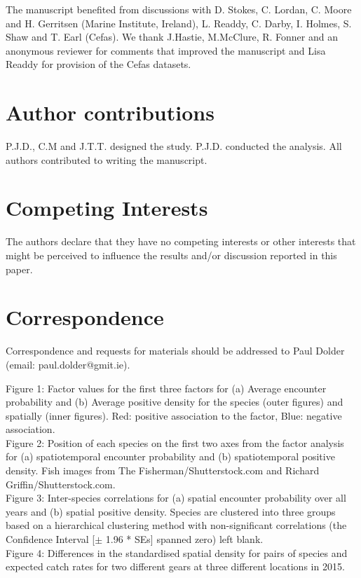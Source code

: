 \documentclass[fleqn,10pt]{wlscirep}
\begin{document}
The manuscript benefited from discussions with D. Stokes, C.  Lordan, C. Moore
and H. Gerritsen (Marine Institute, Ireland), L.  Readdy, C.  Darby, I. Holmes,
S. Shaw and T. Earl (Cefas). We thank J.Hastie, M.McClure, R. Fonner and an
anonymous reviewer for comments that improved the manuscript and Lisa Readdy
for provision of the Cefas datasets.

\section*{Author contributions}
P.J.D., C.M and J.T.T. designed the study. P.J.D. conducted the analysis. All
authors contributed to writing the manuscript.  


\section*{Competing Interests}
The authors declare that they have no competing interests or other interests
that might be perceived to influence the results and/or discussion reported in
this paper.

\section*{Correspondence}
Correspondence and requests for materials should be addressed to Paul Dolder
(email: paul.dolder@gmit.ie).



\newpage

Figure 1: Factor values for the first three factors for (a) Average encounter
probability and (b) Average positive density for the species (outer figures)
and spatially (inner figures).  Red: positive association to the factor, Blue:
negative association.\\ 


Figure 2: Position of each species on the first two axes from the factor
analysis for (a) spatiotemporal encounter probability and (b) spatiotemporal
positive density. Fish images from The Fisherman/Shutterstock.com and Richard
Griffin/Shutterstock.com.\\
	
Figure 3: Inter-species correlations for (a) spatial encounter probability over
all years and (b) spatial positive density.  Species are clustered into three
groups based on a hierarchical clustering method with non-significant
correlations (the Confidence Interval [$\pm$ 1.96 * SEs] spanned zero) left
blank.\\

Figure 4: Differences in the standardised spatial density for pairs of species
and expected catch rates for two different gears at three different locations
in 2015.\\
\end{document}
